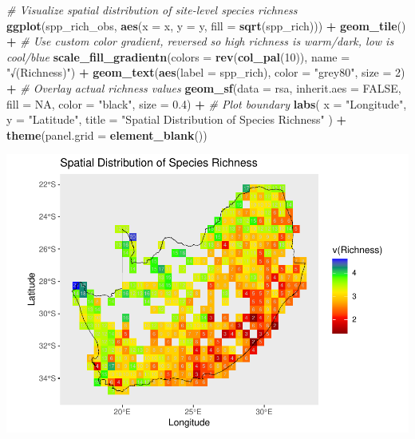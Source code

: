 \documentclass[
]{article}
\newenvironment{Shaded}{\begin{snugshade}}{\end{snugshade}}
\newcommand{\AttributeTok}[1]{\textcolor[rgb]{0.13,0.29,0.53}{#1}}
\newcommand{\CommentTok}[1]{\textcolor[rgb]{0.56,0.35,0.01}{\textit{#1}}}
\newcommand{\ConstantTok}[1]{\textcolor[rgb]{0.56,0.35,0.01}{#1}}
\newcommand{\DecValTok}[1]{\textcolor[rgb]{0.00,0.00,0.81}{#1}}
\newcommand{\FloatTok}[1]{\textcolor[rgb]{0.00,0.00,0.81}{#1}}
\newcommand{\FunctionTok}[1]{\textcolor[rgb]{0.13,0.29,0.53}{\textbf{#1}}}
\newcommand{\NormalTok}[1]{#1}
\newcommand{\SpecialCharTok}[1]{\textcolor[rgb]{0.81,0.36,0.00}{\textbf{#1}}}
\newcommand{\StringTok}[1]{\textcolor[rgb]{0.31,0.60,0.02}{#1}}
\begin{document}
\begin{Shaded}
\begin{Highlighting}[]
\CommentTok{\# Visualize spatial distribution of site{-}level species richness}
\FunctionTok{ggplot}\NormalTok{(spp\_rich\_obs, }\FunctionTok{aes}\NormalTok{(}\AttributeTok{x =}\NormalTok{ x, }\AttributeTok{y =}\NormalTok{ y, }\AttributeTok{fill =} \FunctionTok{sqrt}\NormalTok{(spp\_rich))) }\SpecialCharTok{+}
  \FunctionTok{geom\_tile}\NormalTok{() }\SpecialCharTok{+}
  \CommentTok{\# Use custom color gradient, reversed so high richness is warm/dark, low is cool/blue}
  \FunctionTok{scale\_fill\_gradientn}\NormalTok{(}\AttributeTok{colors =} \FunctionTok{rev}\NormalTok{(}\FunctionTok{col\_pal}\NormalTok{(}\DecValTok{10}\NormalTok{)), }\AttributeTok{name =} \StringTok{"√(Richness)"}\NormalTok{) }\SpecialCharTok{+}
  \FunctionTok{geom\_text}\NormalTok{(}\FunctionTok{aes}\NormalTok{(}\AttributeTok{label =}\NormalTok{ spp\_rich), }\AttributeTok{color =} \StringTok{"grey80"}\NormalTok{, }\AttributeTok{size =} \DecValTok{2}\NormalTok{) }\SpecialCharTok{+} \CommentTok{\# Overlay actual richness values}
  \FunctionTok{geom\_sf}\NormalTok{(}\AttributeTok{data =}\NormalTok{ rsa, }\AttributeTok{inherit.aes =} \ConstantTok{FALSE}\NormalTok{, }\AttributeTok{fill =} \ConstantTok{NA}\NormalTok{, }\AttributeTok{color =} \StringTok{"black"}\NormalTok{, }\AttributeTok{size =} \FloatTok{0.4}\NormalTok{) }\SpecialCharTok{+}  \CommentTok{\# Plot boundary}
  \FunctionTok{labs}\NormalTok{(}
    \AttributeTok{x =} \StringTok{"Longitude"}\NormalTok{,}
    \AttributeTok{y =} \StringTok{"Latitude"}\NormalTok{,}
    \AttributeTok{title =} \StringTok{"Spatial Distribution of Species Richness"}
\NormalTok{  ) }\SpecialCharTok{+}
  \FunctionTok{theme}\NormalTok{(}\AttributeTok{panel.grid =} \FunctionTok{element\_blank}\NormalTok{())}
\end{Highlighting}
\end{Shaded}

\includegraphics[width=1\linewidth]{man/figures/README-site-richness-1}
\end{document}
